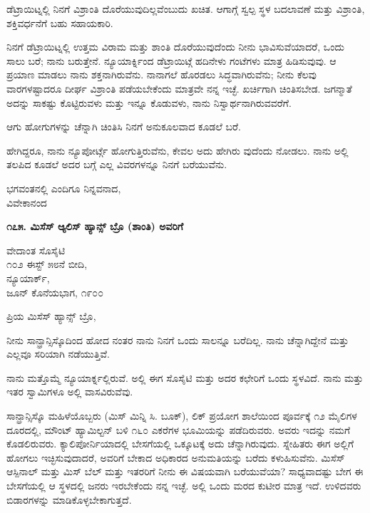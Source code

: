 ಡೆಟ್ರಾಯಿಟ್ನಲ್ಲಿ ನಿನಗೆ ವಿಶ್ರಾಂತಿ ದೊರೆಯುವುದಿಲ್ಲವೆಂಬುದು ಖಚಿತ. ಆಗಾಗ್ಗೆ ಸ್ವಲ್ಪ ಸ್ಥಳ ಬದಲಾವಣೆ ಮತ್ತು ವಿಶ್ರಾಂತಿ, ಶಕ್ತಿವರ್ಧನೆಗೆ ಬಹು ಸಹಾಯಕಾರಿ.

ನಿನಗೆ ಡೆಟ್ರಾಯಿಟ್ನಲ್ಲಿ ಉತ್ತಮ ವಿರಾಮ ಮತ್ತು ಶಾಂತಿ ದೊರೆಯುವುದೆಂದು ನೀನು ಭಾವಿಸುವೆಯಾದರೆ, ಒಂದು ಸಾಲು ಬರೆ; ನಾನು ಬರುತ್ತೇನೆ. ನ್ಯೂಯಾರ್ಕ್ನಿಂದ ಡೆಟ್ರಾಯಿಟ್ಗೆ ಹದಿನೇಳು ಗಂಟೆಗಳು ಮಾತ್ರ ಹಿಡಿಸುವುವು. ಆ ಪ್ರಯಾಣ ಮಾಡಲು ನಾನು ಶಕ್ತನಾಗಿರುವೆನು. ನಾನಾಗಲೆ ಹೊರಡಲು ಸಿದ್ಧವಾಗಿರುವೆನು; ನೀನು ಕೆಲವು ವಾರಗಳಷ್ಟಾದರೂ ದೀರ್ಘ ವಿಶ್ರಾಂತಿ ಪಡೆಯಬೇಕೆಂದು ಮಾತ್ರವೇ ನನ್ನ ಇಚ್ಛೆ. ಖರ್ಚಿಗಾಗಿ ಚಿಂತಿಸಬೇಡ. ಜಗನ್ಮಾತೆ ಅದನ್ನು ಸಾಕಷ್ಟು ಕೊಟ್ಟಿರುವಳು ಮತ್ತು ಇನ್ನೂ ಕೊಡುವಳು, ನಾನು ನಿಸ್ವಾರ್ಥನಾಗಿರುವವರೆಗೆ.

ಆಗು ಹೋಗುಗಳನ್ನು ಚೆನ್ನಾಗಿ ಚಿಂತಿಸಿ ನಿನಗೆ ಅನುಕೂಲವಾದ ಕೂಡಲೆ ಬರೆ.

ಹೇಗಿದ್ದರೂ, ನಾನು ನ್ಯೂಪೋರ್ಟ್ಗೆ ಹೋಗುತ್ತಿರುವೆನು, ಕೇವಲ ಅದು ಹೇಗಿರು ವುದೆಂದು ನೋಡಲು. ನಾನು ಅಲ್ಲಿ ತಲಪಿದ ಕೂಡಲೆ ಅದರ ಬಗ್ಗೆ ಎಲ್ಲ ವಿವರಗಳನ್ನೂ ನಿನಗೆ ಬರೆಯುವೆನು.

\begin{flushright}
ಭಗವಂತನಲ್ಲಿ ಎಂದಿಗೂ ನಿನ್ನವನಾದ,\\ವಿವೇಕಾನಂದ
\end{flushright}

\begin{center}
\textbf{೧೭೫. ಮಿಸೆಸ್ ಆ್ಯಲಿಸ್ ಹ್ಯಾನ್ಸ್ ಬ್ರೊ (ಶಾಂತಿ) ಅವರಿಗೆ}
\end{center}

\begin{flushright}
ವೇದಾಂತ ಸೊಸೈಟಿ\\೧೦೨ ಈಸ್ಟ್ ೫೮ನೆ ಬೀದಿ,\\ನ್ಯೂಯಾರ್ಕ್,\\ಜೂನ್ ಕೊನೆಯಭಾಗ, ೧೯೦೦
\end{flushright}

ಪ್ರಿಯ ಮಿಸೆಸ್ ಹ್ಯಾನ್ಸ್ ಬ್ರೊ,

ನೀನು ಸಾನ್ಫ್ರಾನ್ಸಿಸ್ಕೊದಿಂದ ಹೋದ ನಂತರ ನಾನು ನಿನಗೆ ಒಂದು ಸಾಲನ್ನೂ ಬರೆದಿಲ್ಲ. ನಾನು ಚೆನ್ನಾಗಿದ್ದೇನೆ ಮತ್ತು ಎಲ್ಲವೂ ಸರಿಯಾಗಿ ನಡೆಯುತ್ತಿವೆ.

ನಾನು ಮತ್ತೊಮ್ಮೆ ನ್ಯೂಯಾರ್ಕ್ನಲ್ಲಿರುವೆ. ಅಲ್ಲಿ ಈಗ ಸೊಸೈಟಿ ಮತ್ತು ಅದರ ಕಛೇರಿಗೆ ಒಂದು ಸ್ಥಳವಿದೆ. ನಾನು ಮತ್ತು ಇತರ ಸ್ವಾಮಿಗಳೂ ಅಲ್ಲಿ ವಾಸವಿರುವೆವು.

ಸಾನ್ಫ್ರಾನ್ಸಿಸ್ಕೊ ಮಹಿಳೆಯೊಬ್ಬರು (ಮಿಸ್ ಮಿನ್ನಿ ಸಿ. ಬೂಕ್), ಲಿಕ್ ಪ್ರಯೋಗ ಶಾಲೆಯಿಂದ ಪೂರ್ವಕ್ಕೆ ೧೨ ಮೈಲಿಗಳ ದೂರದಲ್ಲಿ, ಮೌಂಟ್ ಹ್ಯಾಮಿಲ್ಟನ್ ಬಳಿ ೧೬೦ ಎಕರೆಗಳ ಭೂಮಿಯನ್ನು ಪಡೆದಿರುವರು. ಅವರು ಇದನ್ನು ನಮಗೆ ಕೊಡಲಿರುವರು. ಕ್ಯಾಲಿಪೋರ್ನಿಯಾದಲ್ಲಿ ಬೇಸಗೆಯಲ್ಲಿ ಒಕ್ಕೂಟಕ್ಕೆ ಅದು ಚೆನ್ನಾಗಿರುವುದು. ಸ್ನೇಹಿತರು ಈಗ ಅಲ್ಲಿಗೆ ಹೋಗಲು ಇಚ್ಛಿಸುವುದಾದರೆ, ಅವರಿಗೆ ಬೇಕಾದ ಅಧಿಕಾರದ ಅನುಮತಿಯನ್ನು ಬರೆದು ಕಳುಹಿಸುವೆನು. ಮಿಸೆಸ್ ಆಸ್ಪಿನಾಲ್ ಮತ್ತು ಮಿಸ್ ಬೆಲ್ ಮತ್ತು ಇತರರಿಗೆ ನೀನು ಈ ವಿಷಯವಾಗಿ ಬರೆಯುವೆಯಾ? ಸಾಧ್ಯವಾದಷ್ಟು ಬೇಗ ಈ ಬೇಸಗೆಯಲ್ಲಿ ಆ ಸ್ಥಳದಲ್ಲಿ ಜನರು ಇರಬೇಕೆಂದು ನನ್ನ ಇಚ್ಛೆ. ಅಲ್ಲಿ ಒಂದು ಮರದ ಕುಟೀರ ಮಾತ್ರ ಇದೆ. ಉಳಿದವರು ಬಿಡಾರಗಳನ್ನು ಮಾಡಿಕೊಳ್ಳಬೇಕಾಗುತ್ತದೆ.

